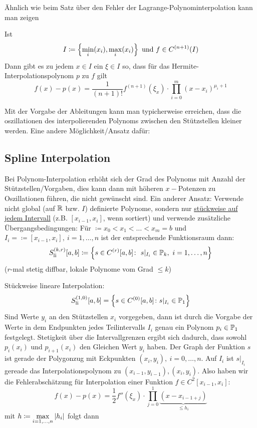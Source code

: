 \documentclass[../Skript.tex]{subfiles}
\begin{document}
Ähnlich wie beim Satz über den Fehler der Lagrange-Polynominterpolation kann man zeigen
\begin{theorem}
    Ist \[
    I \coloneqq \left\{ \min_i(x_i), \max_i(x_i) \right\} \text{ und } f\in C^{(n+1)}(I)
    \]
    Dann gibt es zu jedem $x\in I$ ein $\xi \in I$ so, dass für das Hermite-Interpolationspolynom $p$ zu $f$ gilt\[
    f(x) - p(x) = \frac{1}{(n+1)!}f^{(n+1)}(\xi_x) \cdot \prod_{i=0}^m (x-x_i)^{\mu_i + 1}
    \]
\end{theorem}
Mit der Vorgabe der Ableitungen kann man typicherweise erreichen, dass die oszillationen des interpolierenden Polynoms
zwischen den Stützstellen kleiner werden. Eine andere Möglichkeit/Ansatz dafür:
\subsection{Spline Interpolation}
Bei Polynom-Interpolation erhöht sich der Grad des Polynoms mit Anzahl der Stützstellen/Vorgaben, dies kann dann mit 
höheren $x-$Potenzen zu Oszillationen führen, die nicht gewünscht sind. Ein anderer Ansatz:  Verwende nicht global (auf 
$\mathbb{R}$ bzw. $I$) definierte Polynome, sondern nur \underline{stückweise auf jedem Intervall} (z.B. $[x_{i-1},x_i]$, wenn 
sortiert) und verwende zusätzliche Übergangsbedingungen: Für $\coloneqq x_0<x_1<\dots<x_m=b$ und $I_i=\coloneqq[x_{i-
1},x_i], \ i=1,\dots,n$ ist der entsprechende Funktionsraum dann:\\
\[
    S_{\text{li}}^{(k,r)}[a,b] \coloneqq \left\{ s\in C^{(r)}[a,b]\colon\  s\vert_{I_i} \in \mathbb{P}_k, \ i=1,\dots,n  \right\}
\]
($r$-mal stetig diffbar, lokale Polynome vom Grad $\leq k$)


\begin{example}
    Stückweise lineare Interpolation: \[
    S_{\text{li}}^{(1,0)}[a,b] = \left\{ s\in C^{(0)}[a,b]\colon s\vert_{I_i}\in \mathbb{P}_1  \right\}
    \]
    Sind Werte $y_i$ an den Stützstellen $x_i$ vorgegeben, dann ist durch die Vorgabe der Werte in dem Endpunkten jedes 
    Teilintervalls $I_i$ genau ein Polynom $p_i\in\mathbb{P}_1$ festgelegt. Stetigkeit über die Intervallgrenzen ergibt sich 
    dadurch, dass sowohl $p_i(x_i)$ und $p_{i+1}(x_i)$ den Gleichen Wert $y_i$ haben. Der Graph der Funktion $s$ ist 
    gerade der Polygonzug mit Eckpunkten $(x_i, y_i),\ i=0,\dots, n$. Auf $I_i$ ist $s\vert_{I_i}$ gereade das 
    Interpolationspolynom zu $(x_{i-1}, y_{i-1}), (x_i, y_i)$. Also haben wir die Fehlerabschätzung für Interpolation einer
    Funktion $f\in C^2[x_{i-1}, x_i]:$\[
        f(x) - p(x) = \frac{1}{2}f''(\xi_x) \cdot \prod_{j=0}^1 \underset{\leq h_i}{\underbrace{(x-x_{i-1 + j})}}
    \] mit $h \coloneqq \max\limits_{i=1, \dots, n}\left\vert h_i \right\vert$ folgt dann
\end{example}
\end{document}
